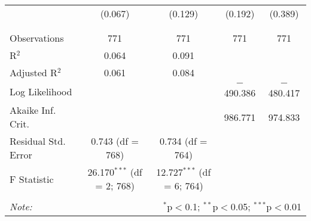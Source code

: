 \begin{table}[!htbp]
\begin{tabular}{@{\extracolsep{5pt}}lcccc}
  & (0.067) & (0.129) & (0.192) & (0.389) \\ 
  & & & & \\ 
\hline \\[-1.8ex] 
Observations & 771 & 771 & 771 & 771 \\ 
R$^{2}$ & 0.064 & 0.091 &  &  \\ 
Adjusted R$^{2}$ & 0.061 & 0.084 &  &  \\ 
Log Likelihood &  &  & $-$490.386 & $-$480.417 \\ 
Akaike Inf. Crit. &  &  & 986.771 & 974.833 \\ 
Residual Std. Error & 0.743 (df = 768) & 0.734 (df = 764) &  &  \\ 
F Statistic & 26.170$^{***}$ (df = 2; 768) & 12.727$^{***}$ (df = 6; 764) &  &  \\ 
\hline 
\hline \\[-1.8ex] 
\textit{Note:}  & \multicolumn{4}{r}{$^{*}$p$<$0.1; $^{**}$p$<$0.05; $^{***}$p$<$0.01} \\ 
\end{tabular} 
\end{table} 
